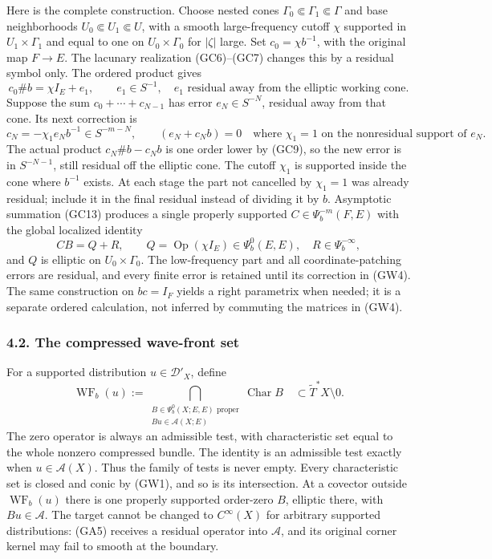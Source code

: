 \documentclass[
  11pt,
]{article}
\begin{document}
Here is the complete construction. Choose nested cones
\(\Gamma_0\Subset\Gamma_1\Subset\Gamma\) and base neighborhoods
\(U_0\Subset U_1\Subset U\), with a smooth large-frequency cutoff
\(\chi\) supported in \(U_1\times\Gamma_1\) and equal to one on
\(U_0\times\Gamma_0\) for \(|\zeta|\) large. Set \(c_0=\chi b^{-1}\),
with the original map \(F\to E\). The lacunary realization (GC6)--(GC7)
changes this by a residual symbol only. The ordered product gives \[
 c_0\# b=\chi I_E+e_1,\qquad e_1\in S^{-1},
 \quad e_1\text{ residual away from the elliptic working cone}.
 \tag{GW3}
\] Suppose the sum \(c_0+\cdots+c_{N-1}\) has error \(e_N\in S^{-N}\),
residual away from that cone. Its next correction is \[
 c_N=-\chi_1e_N b^{-1}\in S^{-m-N},
 \qquad (e_N+c_N b)=0
 \quad\text{where }\chi_1=1\text{ on the nonresidual support of }e_N.
 \tag{GW4}
\] The actual product \(c_N\# b-c_Nb\) is one order lower by (GC9), so
the new error is in \(S^{-N-1}\), still residual off the elliptic cone.
The cutoff \(\chi_1\) is supported inside the cone where \(b^{-1}\)
exists. At each stage the part not cancelled by \(\chi_1=1\) was already
residual; include it in the final residual instead of dividing it by
\(b\). Asymptotic summation (GC13) produces a single properly supported
\(C\in\Psi_b^{-m}(F,E)\) with the global localized identity \[
 CB=Q+R,
 \qquad Q=\operatorname{Op}(\chi I_E)\in\Psi_b^0(E,E),
 \quad R\in\Psi_b^{-\infty},
 \tag{GW5}
\] and \(Q\) is elliptic on \(U_0\times\Gamma_0\). The low-frequency
part and all coordinate-patching errors are residual, and every finite
error is retained until its correction in (GW4). The same construction
on \(b c=I_F\) yields a right parametrix when needed; it is a separate
ordered calculation, not inferred by commuting the matrices in (GW4).

\subsubsection{4.2. The compressed wave-front
set}\label{the-compressed-wave-front-set}

For a supported distribution \(u\in\mathcal D'_X\), define \[
 \operatorname{WF}_b(u)
 :=\bigcap_{\substack{B\in\Psi_b^0(X;E,E)\text{ proper}\\
                         Bu\in\mathcal A(X;E)}}
       \operatorname{Char}B
 \quad\subset\widetilde T^*X\setminus0 .
 \tag{GW6}
\] The zero operator is always an admissible test, with characteristic
set equal to the whole nonzero compressed bundle. The identity is an
admissible test exactly when \(u\in\mathcal A(X)\). Thus the family of
tests is never empty. Every characteristic set is closed and conic by
(GW1), and so is its intersection. At a covector outside
\(\operatorname{WF}_b(u)\) there is one properly supported order-zero
\(B\), elliptic there, with \(Bu\in\mathcal A\). The target cannot be
changed to \(C^\infty(X)\) for arbitrary supported distributions: (GA5)
receives a residual operator into \(\mathcal A\), and its original
corner kernel may fail to smooth at the boundary.
\end{document}
